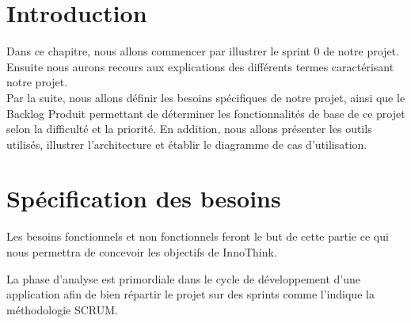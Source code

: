 \section{Introduction}
Dans ce chapitre, nous allons commencer par illustrer le sprint 0 de notre projet.
Ensuite nous aurons recours aux explications des différents termes caractérisant notre projet.\\
Par la suite, nous allons définir les besoins spécifiques de notre projet, ainsi que le Backlog Produit permettant de déterminer les fonctionnalités de base de ce projet selon la difficulté et la priorité. En addition, nous allons présenter les outils utilisés, illustrer l’architecture et établir le diagramme de cas d’utilisation.

\section{Spécification des besoins}
Les besoins fonctionnels et non fonctionnels feront le but de cette partie ce qui nous permettra de concevoir les objectifs de InnoThink.

La phase d’analyse est primordiale dans le cycle de développement d’une application
afin de bien répartir le projet sur des sprints comme l’indique la méthodologie SCRUM.
